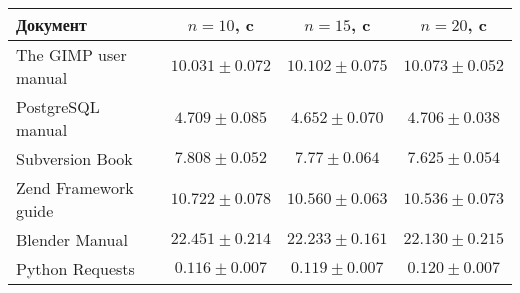 \begin{minipage}{0.9\textwidth}
\begin{adjustbox}{center}
\begin{tabular}{|l||c|c|c|}
	\hline
	Документ & $n = 10$, c & $n = 15$, c & $n = 20$, c  \\
	\hline
	\hline
	The GIMP user manual  & $10.031\pm0.072$  & $10.102\pm0.075$  & $10.073\pm0.052$ \\
	\hline
	PostgreSQL manual & $4.709\pm0.085$ & $4.652\pm0.070$ & $4.706\pm0.038$ \\
	\hline
	Subversion Book & $7.808\pm0.052$ & $7.77\pm0.064$ & $7.625\pm0.054$ \\
	\hline
	Zend Framework guide & $10.722\pm0.078$ & $10.560\pm0.063$ & $10.536\pm0.073$ \\
	\hline
	Blender Manual & $22.451\pm0.214$ & $22.233\pm0.161$ & $22.130\pm0.215$ \\
	\hline
	Python Requests & $0.116\pm0.007$  & $0.119\pm0.007$ & $0.120\pm0.007$ \\
	\hline
\end{tabular}
\end{adjustbox}
\end{minipage}